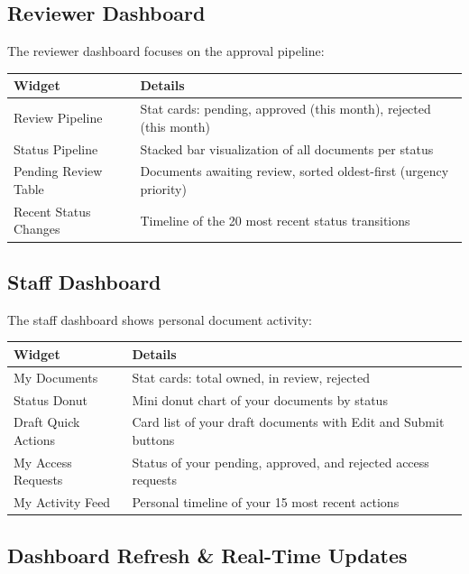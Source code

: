 \subsection{Reviewer Dashboard}

The reviewer dashboard focuses on the approval pipeline:

\begin{tabularx}{\textwidth}{@{} l X @{}}
  \toprule
  \textbf{Widget} & \textbf{Details} \\
  \midrule
  Review Pipeline
    & Stat cards: pending, approved (this month),
      rejected (this month) \\
  Status Pipeline
    & Stacked bar visualization of all documents
      per status \\
  Pending Review Table
    & Documents awaiting review, sorted oldest-first
      (urgency priority) \\
  Recent Status Changes
    & Timeline of the 20 most recent status
      transitions \\
  \bottomrule
\end{tabularx}

\subsection{Staff Dashboard}

The staff dashboard shows personal document activity:

\begin{tabularx}{\textwidth}{@{} l X @{}}
  \toprule
  \textbf{Widget} & \textbf{Details} \\
  \midrule
  My Documents
    & Stat cards: total owned, in review,
      rejected \\
  Status Donut
    & Mini donut chart of your documents
      by status \\
  Draft Quick Actions
    & Card list of your draft documents with
      Edit and Submit buttons \\
  My Access Requests
    & Status of your pending, approved, and
      rejected access requests \\
  My Activity Feed
    & Personal timeline of your 15 most recent
      actions \\
  \bottomrule
\end{tabularx}

\subsection{Dashboard Refresh \& Real-Time Updates}

